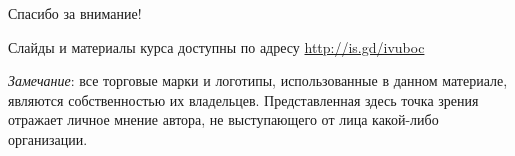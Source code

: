 \begin{frame}

{\huge{Спасибо за внимание!}\par}

\vfill

Слайды и материалы курса доступны по адресу \url{http://is.gd/ivuboc} %

\vfill

\tiny{\textit{Замечание}: все торговые марки и логотипы, использованные в данном материале, являются собственностью их владельцев. Представленная здесь точка зрения отражает личное мнение автора, не выступающего от лица какой-либо организации.}

\end{frame}


